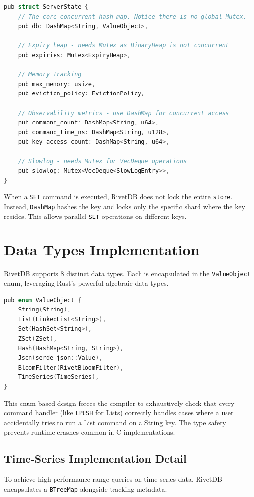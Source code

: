 \begin{lstlisting}[language=C, caption=ServerState Struct Definition]
pub struct ServerState {
    // The core concurrent hash map. Notice there is no global Mutex.
    pub db: DashMap<String, ValueObject>,
    
    // Expiry heap - needs Mutex as BinaryHeap is not concurrent
    pub expiries: Mutex<ExpiryHeap>,
    
    // Memory tracking
    pub max_memory: usize,
    pub eviction_policy: EvictionPolicy,
    
    // Observability metrics - use DashMap for concurrent access
    pub command_count: DashMap<String, u64>,
    pub command_time_ns: DashMap<String, u128>,
    pub key_access_count: DashMap<String, u64>,
    
    // Slowlog - needs Mutex for VecDeque operations
    pub slowlog: Mutex<VecDeque<SlowLogEntry>>,
}
\end{lstlisting}

When a \texttt{SET} command is executed, RivetDB does not lock the entire \texttt{store}. Instead, \texttt{DashMap} hashes the key and locks only the specific shard where the key resides. This allows parallel \texttt{SET} operations on different keys.

\section{Data Types Implementation}

RivetDB supports 8 distinct data types. Each is encapsulated in the \texttt{ValueObject} enum, leveraging Rust's powerful algebraic data types.

\begin{lstlisting}[language=C, caption=The ValueObject Enum (src/storage/value.rs)]
pub enum ValueObject {
    String(String),
    List(LinkedList<String>),
    Set(HashSet<String>),
    ZSet(ZSet),
    Hash(HashMap<String, String>),
    Json(serde_json::Value),
    BloomFilter(RivetBloomFilter),
    TimeSeries(TimeSeries),
}
\end{lstlisting}

This enum-based design forces the compiler to exhaustively check that every command handler (like \texttt{LPUSH} for Lists) correctly handles cases where a user accidentally tries to run a List command on a String key. The type safety prevents runtime crashes common in C implementations.

\subsection{Time-Series Implementation Detail}
To achieve high-performance range queries on time-series data, RivetDB encapsulates a \texttt{BTreeMap} alongside tracking metadata.

